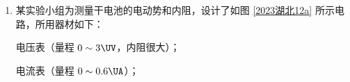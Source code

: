 \documentclass[\gkver]{gaokaozhenti}
\begin{document}
\begin{enumerate}
如图 \ref{2023湖北11a} 所示，木板和木块 A 放在水平桌面上，电子秤放在水平地面上，木块 A 和放在电子秤上的重物 B 通过跨过定滑轮的轻绳相连。调节滑轮，使其与木块 A 间的轻绳水平，与重物 B 间的轻绳竖直。在木块 A 上放置 $n$（$n=0,1,2,3,4,5$）个砝码（电子秤称得每个砝码的质量 $m_{0}$ 为 $20.0\Ug$），向左拉动木板的同时，记录电子秤的对应示数 $m$。


\begin{enumerate}
	\item
	实验中，拉动木板时 （填“必须”或“不必”）保持匀速。
	\item
	用 $m_{A}$ 和 $m_{B}$ 分别表示木块 A 和重物 B 的质量，则 $m$ 和 $m_{A}$、$m_{B}$、$m_{0}$、$\mu$、$n$ 所满足的关系式为 $m = $ 。
	\item
	根据测量数据在坐标纸上绘制出 $m-n$ 图像，如图 \ref{2023湖北11b} 所示，可得木块 A 和木板间的动摩擦因数 $\mu = $ （保留 2 位有效数字）。
\end{enumerate}


\item
某实验小组为测量干电池的电动势和内阻，设计了如图 \ref{2023湖北12a} 所示电路，所用器材如下：

电压表（量程 $0 \sim 3\UV$，内阻很大）；

电流表（量程 $0 \sim 0.6\UA$）；


\end{enumerate}
\end{document}
